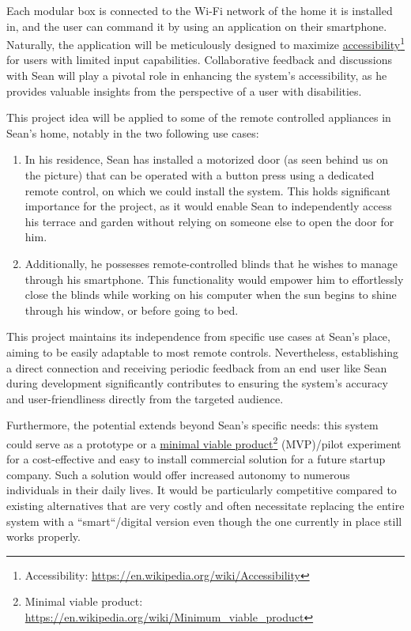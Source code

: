 \documentclass[12pt, a4paper, openany]{article}
\newcommand{\footlink}[2]{\href{#2}{#1}\footnote{{\MakeUppercase #1}: \url{#2}}}
\begin{document}
Each modular box is connected to the Wi-Fi network of the home it is installed in, and the user can command it by using an application on their smartphone.
Naturally, the application will be meticulously designed to maximize \footlink{accessibility}{https://en.wikipedia.org/wiki/Accessibility} for users with limited input capabilities.
Collaborative feedback and discussions with Sean will play a pivotal role in enhancing the system's accessibility, as he provides valuable insights from the perspective of a user with disabilities.

\newpage

This project idea will be applied to some of the remote controlled appliances in Sean's home, notably in the two following use cases:
\begin{enumerate}
    \item In his residence, Sean has installed a motorized door (as seen behind us on the picture) that can be operated with a button press using a dedicated remote control, on which we could install the system.
        This holds significant importance for the project, as it would enable Sean to independently access his terrace and garden without relying on someone else to open the door for him.
    \item Additionally, he possesses remote-controlled blinds that he wishes to manage through his smartphone.
        This functionality would empower him to effortlessly close the blinds while working on his computer when the sun begins to shine through his window, or before going to bed.
\end{enumerate}

This project maintains its independence from specific use cases at Sean's place, aiming to be easily adaptable to most remote controls.
Nevertheless, establishing a direct connection and receiving periodic feedback from an end user like Sean during development significantly contributes to ensuring the system's accuracy and user-friendliness directly from the targeted audience.

Furthermore, the potential extends beyond Sean's specific needs: this system could serve as a prototype or a \footlink{minimal viable product}{https://en.wikipedia.org/wiki/Minimum_viable_product} (MVP)/pilot experiment for a cost-effective and easy to install commercial solution for a future startup company.
Such a solution would offer increased autonomy to numerous individuals in their daily lives.
It would be particularly competitive compared to existing alternatives that are very costly and often necessitate replacing the entire system with a ``smart``/digital version even though the one currently in place still works properly.
\end{document}
